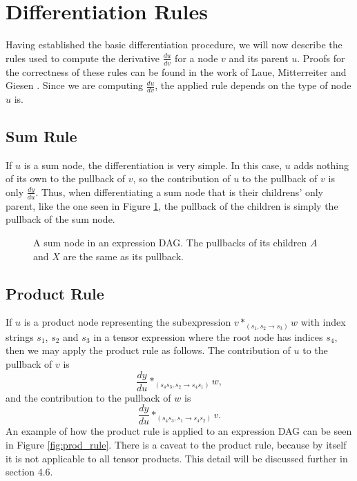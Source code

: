 \documentclass[12pt, a4paper]{report}
\begin{document}
\section{Differentiation Rules}
Having established the basic differentiation procedure, we will now describe the rules used to compute the derivative $\frac{du}{dv}$ for a node $v$ and its parent $u$.
Proofs for the correctness of these rules can be found in the work of Laue, Mitterreiter and Giesen \cite{tensorpaper}.
Since we are computing $\frac{du}{dv}$, the applied rule depends on the type of node $u$ is.

\subsection{Sum Rule}
If $u$ is a sum node, the differentiation is very simple.
In this case, $u$ adds nothing of its own to the pullback of $v$, so the contribution of $u$ to the pullback of $v$ is only $\frac{dy}{du}$.
Thus, when differentiating a sum node that is their childrens' only parent, like the one seen in Figure \ref{fig:sum_rule}, the pullback of the children is simply the pullback of the sum node.

\begin{figure}
    \centering
    \caption{A sum node in an expression DAG. The pullbacks of its children $A$ and $X$ are the same as its pullback.}
    \label{fig:sum_rule}
\end{figure}

\subsection{Product Rule}
If $u$ is a product node representing the subexpression $v *_{(s_1,s_2 \rightarrow s_3)} w$ with index strings $s_1$, $s_2$ and $s_3$ in a tensor expression where the root node has indices $s_4$, then we may apply the product rule as follows.
The contribution of $u$ to the pullback of $v$ is 
$$
\frac{dy}{du} *_{(s_4s_3,s_2 \rightarrow s_4s_1)} w,
$$
and the contribution to the pullback of $w$ is 
$$
\frac{dy}{du} *_{(s_4s_3,s_1 \rightarrow s_4s_2)} v.
$$
An example of how the product rule is applied to an expression DAG can be seen in Figure \ref{fig:prod_rule}.
There is a caveat to the product rule, because by itself it is not applicable to all tensor products.
This detail will be discussed further in section 4.6.
\end{document}
